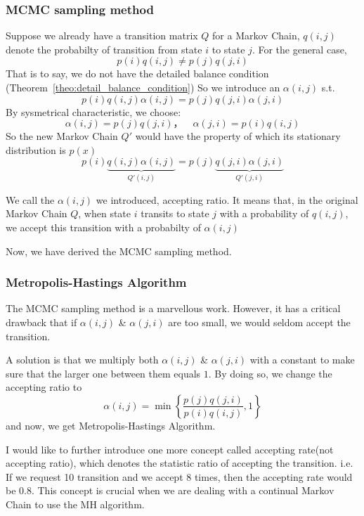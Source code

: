 \subsubsection{MCMC sampling method}
Suppose we already have a transition matrix $Q$ for a Markov Chain, $q(i,j)$ denote the probabilty of transition from state $i$ to state $j$. For the general case, 
$$p(i) q(i,j) \neq p(j) q(j,i)$$
That is to say, we do not have the detailed balance condition (Theorem~\ref{theo:detail_balance_condition})
So we introduce an $\alpha(i,j)$ s.t.
\begin{equation} 
p(i) q(i,j)\alpha(i,j) = p(j) q(j,i)\alpha(j,i) 
\end{equation}
By sysmetrical characteristic, we choose:
\begin{equation} 
\alpha(i,j)= p(j) q(j,i)， \quad \alpha(j,i) = p(i) q(i,j)
\end{equation}
So the new Markov Chain $Q'$ would have the property of which its stationary distribution is $p(x)$
\begin{equation}
\label{detailed-balance} 
p(i) \underbrace{q(i,j)\alpha(i,j)}_{Q'(i,j)} 
= p(j) \underbrace{q(j,i)\alpha(j,i)}_{Q'(j,i)}
\end{equation}

We call the $\alpha(i,j)$ we introduced, accepting ratio. It means that, in the original Markov Chain $Q$, when state $i$ transits to state $j$ with a probability of $q(i,j)$, we accept this transition with a probabilty of $\alpha(i,j)$

Now, we have derived the MCMC sampling method.

\subsubsection{Metropolis-Hastings Algorithm}
The MCMC sampling method is a marvellous work. However, it has a critical drawback that if $\alpha(i,j)$ \& $\alpha(j,i)$ are too small, we would seldom accept the transition.

A solution is that we multiply both $\alpha(i,j)$ \& $\alpha(j,i)$ with a constant to make sure that the larger one between them equals $1$. By doing so, we change the accepting ratio to
\begin{equation}
\alpha(i,j) = \min\left\{\frac{p(j)q(j,i)}{p(i)q(i,j)},1\right\}
\end{equation}
and now, we get Metropolis-Hastings Algorithm\cite{hastings1970monte}.

I would like to further introduce one more concept called accepting rate(not accepting ratio), which denotes the statistic ratio of accepting the transition. i.e. If we request 10 transition and we accept 8 times, then the accepting rate would be 0.8. This concept is crucial when we are dealing with a continual Markov Chain to use the MH algorithm.



